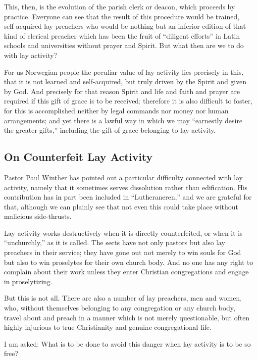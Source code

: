 This, then, is the evolution of the parish clerk or deacon, which proceeds by practice. Everyone can see that the result of this procedure would be trained, self-acquired lay preachers who would be nothing but an inferior edition of that kind of clerical preacher which has been the fruit of “diligent efforts” in Latin schools and universities without prayer and Spirit. But what then are we to do with lay activity?

For us Norwegian people the peculiar value of lay activity lies precisely in this, that it is not learned and self-acquired, but truly driven by the Spirit and given by God. And precisely for that reason Spirit and life and faith and prayer are required if this gift of grace is to be received; therefore it is also difficult to foster, for this is accomplished neither by legal commands nor money nor human arrangements; and yet there is a lawful way in which we may “earnestly desire the greater gifts,” including the gift of grace belonging to lay activity.

\subsection{On Counterfeit Lay Activity}

Pastor Paul Winther has pointed out a particular difficulty connected with lay activity, namely that it sometimes serves dissolution rather than edification. His contribution has in part been included in “Lutheraneren,” and we are grateful for that, although we can plainly see that not even this could take place without malicious side-thrusts.

Lay activity works destructively when it is directly counterfeited, or when it is “unchurchly,” as it is called. The sects have not only pastors but also lay preachers in their service; they have gone out not merely to win souls for God but also to win proselytes for their own church body. And no one has any right to complain about their work unless they enter Christian congregations and engage in proselytizing.

But this is not all. There are also a number of lay preachers, men and women, who, without themselves belonging to any congregation or any church body, travel about and preach in a manner which is not merely questionable, but often highly injurious to true Christianity and genuine congregational life.

I am asked: What is to be done to avoid this danger when lay activity is to be so free?

